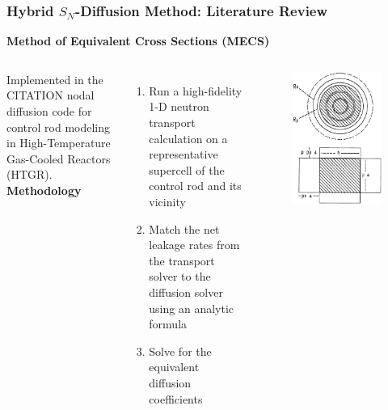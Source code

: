 \begin{frame}
  \frametitle{Hybrid $S_N$-Diffusion Method: Literature Review}
  \textbf{Method of Equivalent Cross Sections (MECS)}
  \begin{columns}
    \column[t]{7cm}
    \vspace{.1cm}

    Implemented in the CITATION nodal diffusion code for control rod modeling in High-Temperature
    Gas-Cooled Reactors (HTGR). \\
    \textbf{Methodology}
    \begin{enumerate}
      \item Run a high-fidelity 1-D neutron transport calculation on a representative supercell of
        the control rod and its vicinity
      \item Match the net leakage rates from the transport solver to the diffusion solver using an
        analytic formula
      \item Solve for the equivalent diffusion coefficients
    \end{enumerate}
    \column[t]{4cm}
    \begin{figure}
      \centering
      \includegraphics[width=.75\columnwidth]{../images/mecs-geometry}

\end{figure}
\end{columns}
\end{frame}
